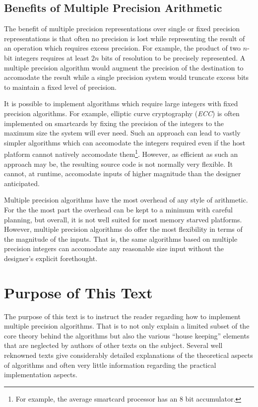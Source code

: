 \documentclass[b5paper]{book}
\begin{document}
\subsection{Benefits of Multiple Precision Arithmetic}
The benefit of multiple precision representations over single or fixed precision representations is that 
often no precision is lost while representing the result of an operation which requires excess precision.  For example, 
the product of two $n$-bit integers requires at least $2n$ bits of resolution to be precisely represented.  
A multiple precision algorithm would augment the precision of the destination to accomodate the result while a single 
precision system would truncate excess bits to maintain a fixed level of precision.

It is possible to implement algorithms which require large integers with fixed precision algorithms.  For example, elliptic
curve cryptography (\textit{ECC}) is often implemented on smartcards by fixing the precision of the integers to the maximum 
size the system will ever need.  Such an approach can lead to vastly simpler algorithms which can accomodate the 
integers required even if the host platform cannot natively accomodate them\footnote{For example, the average smartcard 
processor has an 8 bit accumulator.}.  However, as efficient as such an approach may be, the resulting source code is not
normally very flexible.  It cannot, at runtime, accomodate inputs of higher magnitude than the designer anticipated.

Multiple precision algorithms have the most overhead of any style of arithmetic.  For the the most part the 
overhead can be kept to a minimum with careful planning, but overall, it is not well suited for most memory starved
platforms.  However, multiple precision algorithms do offer the most flexibility in terms of the magnitude of the 
inputs.  That is, the same algorithms based on multiple precision integers can accomodate any reasonable size input 
without the designer's explicit forethought.  

\section{Purpose of This Text}
The purpose of this text is to instruct the reader regarding how to implement multiple precision algorithms.  That is 
to not only explain a limited subset of the core theory behind the algorithms but also the various ``house keeping'' 
elements that are neglected by authors of other texts on the subject.  Several well reknowned texts \cite{TAOCPV2,HAC} 
give considerably detailed explanations of the theoretical aspects of algorithms and often very little information 
regarding the practical implementation aspects.  
\end{document}
